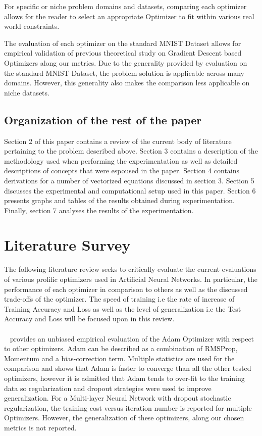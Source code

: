\documentclass{article}
\begin{document}
	For specific or niche problem domains and datasets, comparing each optimizer allows for the reader to select an appropriate Optimizer to fit within various real world constraints.
	
	The evaluation of each optimizer on the standard MNIST Dataset allows for empirical validation of previous theoretical study on Gradient Descent based Optimizers along our metrics. Due to the generality provided by evaluation on the standard MNIST Dataset, the problem solution is applicable across many domains. However, this generality also makes the comparison less applicable on niche datasets.
	
	
	\subsection{Organization of the rest of the paper}
	
	Section 2 of this paper contains a review of the current body of literature pertaining to the problem described above. Section 3 contains a description of the methodology used when performing the experimentation as well as detailed descriptions of concepts that were espoused in the paper. Section 4 contains derivations for a number of vectorized equations discussed in section 3. Section 5 discusses the experimental and computational setup used in this paper. Section 6 presents graphs and tables of the results obtained during experimentation. Finally, section 7 analyses the results of the experimentation.
	
	
\section{Literature Survey}	
 The following literature review seeks to critically evaluate the current evaluations of various prolific optimizers used in Artificial Neural Networks. In particular, the performance of each optimizer in comparison to others as well as the discussed trade-offs of the optimizer. The speed of training i.e the rate of increase of Training Accuracy and Loss as well as the level of generalization i.e the Test Accuracy and Loss will be focused upon in this review.
 
 
 \paragraph{}~\citet{kingma2014adam} provides an unbiased empirical evaluation of the Adam Optimizer with respect to other optimizers. Adam can be described as a combination of RMSProp, Momentum and a bias-correction term.
 Multiple statistics are used for the comparison and shows that Adam is faster to converge than all the other tested optimizers, however it is admitted that Adam tends to over-fit to the training data so regularization and dropout strategies were used to improve generalization. For a Multi-layer Neural Network with dropout stochastic regularization, the training cost versus iteration number is reported for multiple Optimizers. However, the generalization of these optimizers, along our chosen metrics is not reported.
 
\end{document}
